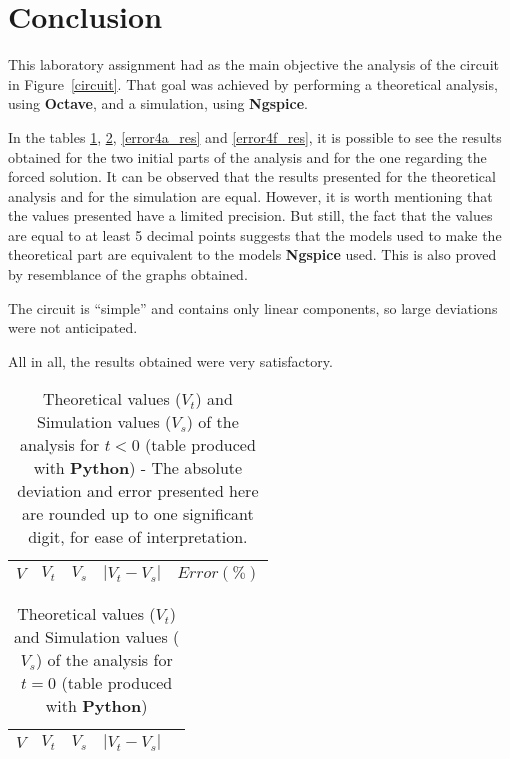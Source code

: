 \section{Conclusion}
\label{sec:conclusion}

This laboratory assignment had as the main objective the analysis of the circuit in Figure~\ref{circuit}. That goal was achieved by performing a theoretical analysis, using {\bf Octave}, and a simulation, using {\bf Ngspice}.

In the tables \ref{error1_res}, \ref{error2_res}, \ref{error4a_res} and \ref{error4f_res}, it is possible to see the results obtained for the two initial parts of the analysis and for the one regarding the forced solution. It can be observed that the results presented for the theoretical analysis and for the simulation are equal. However, it is worth mentioning that the values presented have a limited precision. But still, the fact that the values are equal to at least 5 decimal points suggests that the models used to make the theoretical part are equivalent to the models {\bf Ngspice} used. This is also proved by resemblance of the graphs obtained.

The circuit is ``simple'' and contains only linear components, so large deviations were not anticipated.

All in all, the results obtained were very satisfactory.

\begin{table}[H]
  \centering
  \begin{tabular}{|c|c|c|c|c|}
    \hline
        $V$ & $V_t$ & $V_s$ & $|V_t-V_s|$ & $Error (\%)$ \\
        \hline
        \hline
        
        \hline
  \end{tabular}
  \caption{Theoretical values ($V_t$) and Simulation values ($V_s$) of the analysis for $t < 0$ (table produced with {\bf Python}) - The absolute deviation and error presented here are rounded up to one significant digit, for ease of interpretation.}
  \label{error1_res}
\end{table}

\begin{table}[H]
  \centering
  \begin{tabular}{|c|c|c|c|c|}
    \hline
        $V$ & $V_t$ & $V_s$ & $|V_t-V_s|$ \\
        \hline
        \hline
        
        \hline
  \end{tabular}
  \caption{Theoretical values ($V_t$) and Simulation values ($V_s$) of the analysis for $t = 0$ (table produced with {\bf Python})}
  \label{error2_res}
\end{table}

